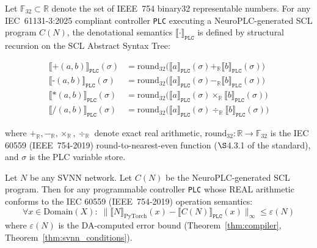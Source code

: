 \begin{definition}
\label{def:iec_real_semantics}
Let $\mathbb{F}_{32} \subset \mathbb{R}$ denote the set of IEEE~754
binary32 representable numbers. For any IEC~61131-3:2025 compliant
controller \texttt{PLC} executing a NeuroPLC-generated SCL program
$C(N)$, the denotational semantics $\llbracket \cdot
\rrbracket_{\texttt{PLC}}$ is defined by structural recursion on the
SCL Abstract Syntax Tree:

\begin{align}
\llbracket \texttt{+}(a, b) \rrbracket_{\texttt{PLC}}(\sigma) &=
\mathrm{round}_{32}\bigl(\llbracket a \rrbracket_{\texttt{PLC}}(\sigma)
+_{\mathbb{R}} \llbracket b \rrbracket_{\texttt{PLC}}(\sigma)\bigr) \\
\llbracket \texttt{-}(a, b) \rrbracket_{\texttt{PLC}}(\sigma) &=
\mathrm{round}_{32}\bigl(\llbracket a \rrbracket_{\texttt{PLC}}(\sigma)
-_{\mathbb{R}} \llbracket b \rrbracket_{\texttt{PLC}}(\sigma)\bigr) \\
\llbracket \texttt{*}(a, b) \rrbracket_{\texttt{PLC}}(\sigma) &=
\mathrm{round}_{32}\bigl(\llbracket a \rrbracket_{\texttt{PLC}}(\sigma)
\times_{\mathbb{R}} \llbracket b \rrbracket_{\texttt{PLC}}(\sigma)\bigr) \\
\llbracket \texttt{/}(a, b) \rrbracket_{\texttt{PLC}}(\sigma) &=
\mathrm{round}_{32}\bigl(\llbracket a \rrbracket_{\texttt{PLC}}(\sigma)
\div_{\mathbb{R}} \llbracket b \rrbracket_{\texttt{PLC}}(\sigma)\bigr)
\end{align}

where $+_{\mathbb{R}}, -_{\mathbb{R}}, \times_{\mathbb{R}}, \div_{\mathbb{R}}$
denote exact real arithmetic, $\mathrm{round}_{32}: \mathbb{R} \to
\mathbb{F}_{32}$ is the IEC 60559 (IEEE~754-2019) round-to-nearest-even
function ($\S$4.3.1 of the standard), and $\sigma$ is the PLC variable
store.
\end{definition}

\vspace{4pt}
\begin{lemma}
\label{lem:iec_universal}
Let $N$ be any SVNN network. Let $C(N)$ be the NeuroPLC-generated SCL
program. Then for any programmable controller \texttt{PLC} whose REAL arithmetic
conforms to the IEC 60559 (IEEE~754-2019) operation semantics:
\begin{equation}
\forall x \in \text{Domain}(X):\;
\|\llbracket N \rrbracket_{\text{PyTorch}}(x) -
  \llbracket C(N) \rrbracket_{\texttt{PLC}}(x)\|_\infty
\leq \varepsilon(N)
\label{eq:iec_universal}
\end{equation}
where $\varepsilon(N)$ is the DA-computed error bound
(Theorem~\ref{thm:compiler}, Theorem~\ref{thm:svnn_conditions}).
\end{lemma}

